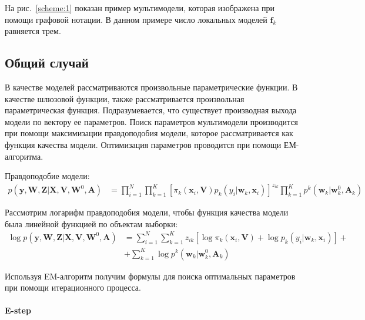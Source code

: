 \documentclass[12pt, twoside]{article}
\numberwithin{equation}{section}
\begin{document}
На рис.~\ref{scheme:1} показан пример мультимодели, которая изображена при помощи графовой нотации. В данном примере число локальных моделей $\textbf{f}_k$ равняется трем.

\subsection{Общий случай}
В качестве моделей рассматриваются произвольные параметрические функции. В качестве шлюзовой функции, также рассматривается произвольная параметрическая функция. Подразумевается, что существует производная выхода модели по вектору ее параметров. Поиск параметров мультимодели производится при помощи максимизации правдоподобия модели, которое рассматривается как функция качества модели. Оптимизация параметров проводится при помощи ЕМ-алгоритма.

Правдоподобие модели:
\begin{equation}
\label{eq:st:3}
\begin{aligned}
p\left(\textbf{y}, \textbf{W}, \textbf{Z}|\textbf{X}, \textbf{V}, \textbf{W}^{0}, \textbf{A}\right) &= \prod_{i=1}^{N}\prod_{k=1}^{K}\left[\pi_{k}\left(\textbf{x}_i,\textbf{V}\right)p_k\left(y_i|\textbf{w}_{k}, \textbf{x}_i\right)\right]^{z_{ik}}\prod_{k=1}^{K}p^{k}\left(\textbf{w}_{k}|\textbf{w}^{0}_{k}, \textbf{A}_{k}\right)
\end{aligned}
\end{equation}

Рассмотрим логарифм правдоподобия модели, чтобы функция качества модели была линейной функцией по объектам выборки:
\begin{equation}
\label{eq:st:4}
\begin{aligned}
\log p\left(\textbf{y}, \textbf{W}, \textbf{Z}|\textbf{X}, \textbf{V}, \textbf{W}^{0}, \textbf{A}\right) &= \sum_{i=1}^{N}\sum_{k=1}^{K}z_{ik}\left[\log\pi_k\left(\textbf{x}_i, \textbf{V}\right) + \log p_k\left(y_i|\textbf{w}_{k}, \textbf{x}_{i}\right)\right] +\\
&+ \sum_{k=1}^{K}\log p^{k}\left(\textbf{w}_{k}|\textbf{w}^{0}_{k}, \textbf{A}_{k}\right)
\end{aligned}
\end{equation}

Используя EM-алгоритм получим формулы для поиска оптимальных параметров при помощи итерационного процесса. 
\paragraph{E-step}~
\end{document}

